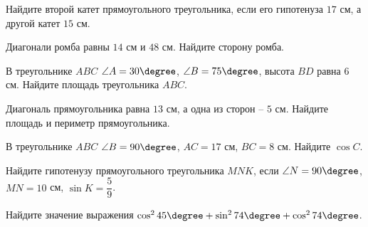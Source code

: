 \begin{exam}
	\begin{listofex}
		\item Найдите второй катет прямоугольного треугольника, если его гипотенуза \( 17 \) см, а другой катет \( 15 \) см.
		\item  Диагонали ромба равны \( 14 \) см и \( 48 \) см. Найдите сторону ромба.
		\item В треугольнике \( ABC \) \( \angle A = 30\degree \), \( \angle B = 75\degree \), высота \( BD \) равна \( 6 \) см. Найдите площадь треугольника \( ABC \).
		\item Диагональ прямоугольника равна \( 13 \) см, а одна из сторон – \( 5 \) см. Найдите площадь и периметр прямоугольника.
		\item В треугольнике \( ABC \) \( \angle B = 90\degree \), \( AC = 17 \) см, \( BC = 8 \) см. Найдите \( \cos C \).
		\item  Найдите гипотенузу прямоугольного треугольника \( MNK  \), если  \( \angle N = 90\degree \), \( MN = 10 \) см, \( \sin K = \dfrac{5}{9} \).		
		\item  Найдите значение выражения \( \cos^{2} 45\degree + \sin^{2} 74\degree + \cos^{2} 74\degree \).
	\end{listofex}
\end{exam}

